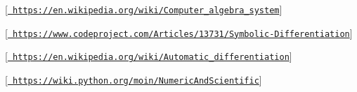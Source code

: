 \mbox{[}\href{https://en.wikipedia.org/wiki/Computer_algebra_system}{\texttt{ https\+://en.\+wikipedia.\+org/wiki/\+Computer\+\_\+algebra\+\_\+system}}\mbox{]}

\mbox{[}\href{https://www.codeproject.com/Articles/13731/Symbolic-Differentiation}{\texttt{ https\+://www.\+codeproject.\+com/\+Articles/13731/\+Symbolic-\/\+Differentiation}}\mbox{]}

\mbox{[}\href{https://en.wikipedia.org/wiki/Automatic_differentiation}{\texttt{ https\+://en.\+wikipedia.\+org/wiki/\+Automatic\+\_\+differentiation}}\mbox{]}

\mbox{[}\href{https://wiki.python.org/moin/NumericAndScientific}{\texttt{ https\+://wiki.\+python.\+org/moin/\+Numeric\+And\+Scientific}}\mbox{]} 
